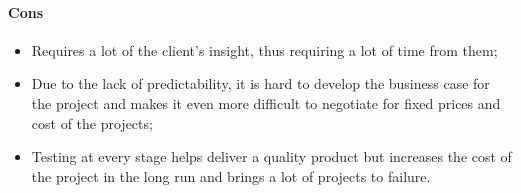 \documentclass[main.tex]{subfiles}
\begin{document}
\paragraph{Cons}
\begin{itemize}
	\item Requires a lot of the client's insight, thus requiring a lot of time from them;
	\item Due to the lack of predictability, it is hard to develop the business case for the project and makes it even more difficult to negotiate for fixed prices and cost of the projects;
	\item Testing at every stage helps deliver a quality product but increases the cost of the project in the long run and brings a lot of projects to failure.
\end{itemize}
\end{document}

